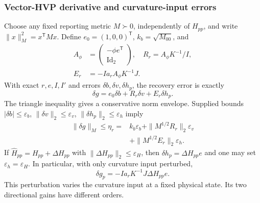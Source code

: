 \documentclass[10pt,a4paper]{article}
\begin{document}
\subsubsection{Vector-HVP derivative and curvature-input errors}
Choose any fixed reporting metric $M\succ0$, independently of $H_{pp}$, and write $\|x\|_M^2=x^{\mathsf T}Mx$. Define $e_0=(1,0,0)^{\mathsf T}$, $k_b=\sqrt{M_{00}}$, and
\begin{equation}
 \begin{aligned}
 A_\phi&=\begin{pmatrix}-\phi e^{\mathsf T}\\\operatorname{Id}_2\end{pmatrix},\quad
 R_r=A_\phi K^{-1}/I,\\
 E_r&=-Ia_r A_\phi K^{-1}J.
 \end{aligned}
 \label{eq:correctedoperator}
\end{equation}
With exact $r,e,I,I'$ and errors $\delta b,\delta v,\delta h_p$, the recovery error is exactly
\begin{equation}
 \delta g=e_0\delta b+R_r\delta v+E_r\delta h_p.
 \label{eq:curvatureerror}
\end{equation}
The triangle inequality gives a conservative norm envelope. Supplied bounds $|\delta b|\leq\varepsilon_b$, $\|\delta v\|_2\leq\varepsilon_v$, $\|\delta h_p\|_2\leq\varepsilon_h$ imply
\begin{equation}
 \begin{aligned}
 \|\delta g\|_M\leq\eta_r={}&k_b\varepsilon_b
 +\|M^{1/2}R_r\|_2\varepsilon_v\\
 &+\|M^{1/2}E_r\|_2\varepsilon_h.
 \end{aligned}
 \label{eq:correctederror}
\end{equation}
If $\widehat H_{pp}=H_{pp}+\Delta H_{pp}$ with $\|\Delta H_{pp}\|_2\leq\varepsilon_H$, then $\delta h_p=\Delta H_{pp}e$ and one may set $\varepsilon_h=\varepsilon_H$. In particular, with only curvature input perturbed,
\begin{equation}
 \delta g_p=-Ia_rK^{-1}J\Delta H_{pp}e.
 \label{eq:curvaturebias}
\end{equation}
This perturbation varies the curvature input at a fixed physical state. Its two directional gains have different orders.
\end{document}
